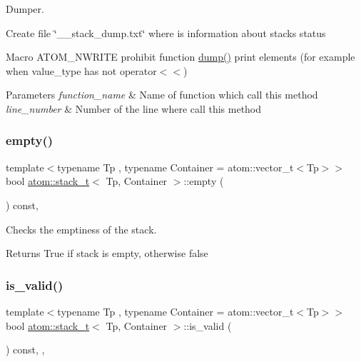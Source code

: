 Dumper. 

Create file \char`\"{}\+\_\+\+\_\+stack\+\_\+dump.\+txt\char`\"{} where is information about stack\textquotesingle{}s status

Macro A\+T\+O\+M\+\_\+\+N\+W\+R\+I\+TE prohibit function \hyperlink{classatom_1_1stack__t_a424f65300ba04f8000ec6bf315595d1b}{dump()} print elements (for example when value\+\_\+type has not operator$<$$<$) 
\begin{DoxyParams}{Parameters}
{\em function\+\_\+name} & Name of function which call this method \\
\hline
{\em line\+\_\+number} & Number of the line where call this method \\
\hline
\end{DoxyParams}
\mbox{\label{classatom_1_1stack__t_a3db873b3a1217f10fc1d6154d717b84d}} 
\subsubsection{\texorpdfstring{empty()}{empty()}}
{\footnotesize\ttfamily template$<$typename Tp , typename Container  = atom\+::vector\+\_\+t$<$\+Tp$>$$>$ \\
bool \hyperlink{classatom_1_1stack__t}{atom\+::stack\+\_\+t}$<$ Tp, Container $>$\+::empty (\begin{DoxyParamCaption}{ }\end{DoxyParamCaption}) const\hspace{0.3cm}{\ttfamily [inline]}, {\ttfamily [noexcept]}}



Checks the emptiness of the stack. 

\begin{DoxyReturn}{Returns}
True if stack is empty, otherwise false 
\end{DoxyReturn}
\mbox{\label{classatom_1_1stack__t_aad558411c92e7c1776ad82be0ea876ee}} 
\subsubsection{\texorpdfstring{is\+\_\+valid()}{is\_valid()}}
{\footnotesize\ttfamily template$<$typename Tp , typename Container  = atom\+::vector\+\_\+t$<$\+Tp$>$$>$ \\
bool \hyperlink{classatom_1_1stack__t}{atom\+::stack\+\_\+t}$<$ Tp, Container $>$\+::is\+\_\+valid (\begin{DoxyParamCaption}{ }\end{DoxyParamCaption}) const\hspace{0.3cm}{\ttfamily [inline]}, {\ttfamily [private]}, {\ttfamily [noexcept]}}



